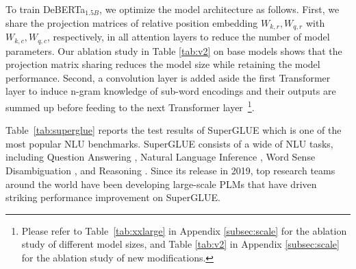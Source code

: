 To train DeBERTa$_{1.5B}$, we optimize the model architecture as follows. 
First, we share the projection matrices of relative position embedding $W_{k,r},W_{q,r}$ with $W_{k,c},W_{q,c}$, respectively, in all attention layers to reduce the number of model parameters. Our ablation study in Table \ref{tab:v2} on base models shows that the projection matrix sharing reduces the model size while retaining the model performance.
Second, a convolution layer is added aside the first Transformer layer to induce n-gram knowledge of sub-word encodings and their outputs are summed up before feeding to the next Transformer layer~\footnote{Please refer to Table~\ref{tab:xxlarge} in Appendix \ref{subsec:scale} for the ablation study of different model sizes, and Table \ref{tab:v2} in Appendix \ref{subsec:scale} for the ablation study of new modifications.}.


Table~\ref{tab:superglue} reports the test results of SuperGLUE \citep{wang2019superglue} which is one of the most popular NLU benchmarks. 
SuperGLUE consists of a wide of NLU tasks, including  
Question Answering \citep{clark2019boolq, khashabi2018multirc, zhang2018record}, 
Natural Language Inference \citep{rte1,rte2,rte3, rte5}, Word Sense Disambiguation \citep{pilehvar2019wic}, and Reasoning \citep{levesque2011winograd,roemmele2011choice}. 
Since its release in 2019, top research teams around the world have been developing large-scale PLMs that have driven striking performance improvement on SuperGLUE. 

